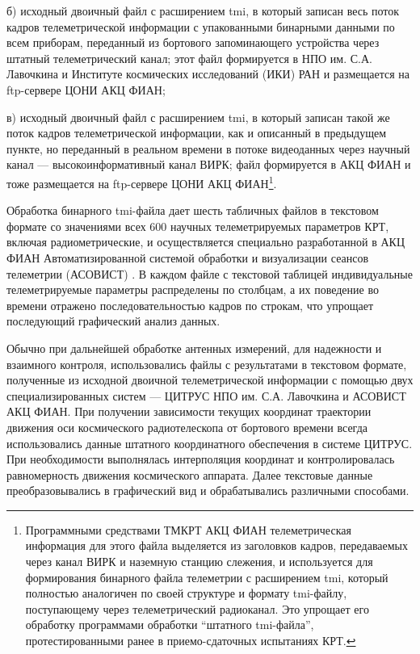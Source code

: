 б) исходный двоичный файл с расширением tmi, в который записан
весь поток кадров телеметрической информации с упакованными бинарными
данными по всем приборам, переданный из бортового запоминающего
устройства через штатный телеметрический канал;
этот файл формируется в НПО им. С.А. Лавочкина и
Институте космических исследований (ИКИ) РАН и
размещается на ftp-сервере ЦОНИ АКЦ ФИАН;

в) исходный двоичный файл с расширением tmi, в который записан
такой же поток кадров телеметрической информации, как и описанный в
предыдущем пункте, но переданный в реальном времени в потоке видеоданных
через научный канал --- высокоинформативный канал ВИРК;
файл формируется в АКЦ ФИАН и тоже размещается на ftp-сервере
ЦОНИ АКЦ ФИАН\footnote
{
Программными средствами ТМКРТ АКЦ ФИАН телеметрическая информация
для этого файла выделяется из заголовков кадров, передаваемых
через канал ВИРК и наземную станцию слежения, и используется для формирования
бинарного файла телеметрии с расширением tmi, который полностью аналогичен
по своей структуре и формату tmi-файлу, поступающему через телеметрический
радиоканал. Это упрощает его обработку программами обработки
``штатного tmi-файла'', протестированными ранее в приемо-сдаточных
испытаниях КРТ.
}.

Обработка бинарного tmi-файла дает шесть табличных файлов в
текстовом формате со значениями всех 600 научных телеметрируемых
параметров КРТ, включая радиометрические, и осуществляется
специально разработанной
в АКЦ ФИАН Автоматизированной системой обработки и визуализации сеансов
телеметрии (АСОВИСТ)  \cite{}.
В каждом файле с текстовой таблицей индивидуальные телеметрируемые
параметры распределены по столбцам, а их поведение во времени отражено
последовательностью кадров по строкам, что упрощает последующий графический
анализ данных.

Обычно при дальнейшей обработке антенных измерений, для надежности и
взаимного контроля, использовались файлы с результатами в текстовом
формате, полученные из исходной двоичной телеметрической информации
   с помощью двух специализированных систем ---
ЦИТРУС НПО им. С.А. Лавочкина и АСОВИСТ АКЦ ФИАН.
При получении зависимости текущих координат траектории движения оси
космического радиотелескопа от бортового времени
всегда использовались данные штатного координатного
обеспечения в системе ЦИТРУС. При необходимости выполнялась интерполяция
координат и контролировалась равномерность движения космического аппарата.
Далее текстовые данные преобразовывались в графический вид и
обрабатывались различными способами.

